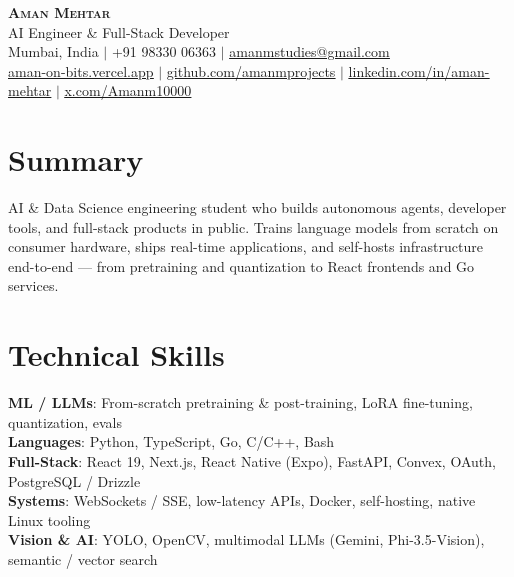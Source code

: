\documentclass[letterpaper,10.5pt]{article}
\begin{document}
\begin{center}
    \textbf{\Huge \scshape Aman Mehtar} \\ \vspace{2pt}
    \small AI Engineer \& Full-Stack Developer \\ \vspace{2pt}
    \small
    Mumbai, India $|$ +91 98330 06363 $|$
    \href{mailto:amanmstudies@gmail.com}{\underline{amanmstudies@gmail.com}} \\ \vspace{2pt}
    \href{https://aman-on-bits.vercel.app}{\underline{aman-on-bits.vercel.app}} $|$
    \href{https://github.com/amanmprojects}{\underline{github.com/amanmprojects}} $|$
    \href{https://www.linkedin.com/in/aman-mehtar}{\underline{linkedin.com/in/aman-mehtar}} $|$
    \href{https://x.com/Amanm10000}{\underline{x.com/Amanm10000}}
\end{center}

\section{Summary}
\small{AI \& Data Science engineering student who builds autonomous agents, developer tools, and full-stack products in public. Trains language models from scratch on consumer hardware, ships real-time applications, and self-hosts infrastructure end-to-end --- from pretraining and quantization to React frontends and Go services.}
\vspace{-2pt}

\section{Technical Skills}
 \begin{itemize}[leftmargin=0.15in, label={}]
    \small{\item{
     \textbf{ML / LLMs}{: From-scratch pretraining \& post-training, LoRA fine-tuning, quantization, evals} \\
     \textbf{Languages}{: Python, TypeScript, Go, C/C++, Bash} \\
     \textbf{Full-Stack}{: React 19, Next.js, React Native (Expo), FastAPI, Convex, OAuth, PostgreSQL / Drizzle} \\
     \textbf{Systems}{: WebSockets / SSE, low-latency APIs, Docker, self-hosting, native Linux tooling} \\
     \textbf{Vision \& AI}{: YOLO, OpenCV, multimodal LLMs (Gemini, Phi-3.5-Vision), semantic / vector search}
    }}
 \end{itemize}
\vspace{-12pt}
\end{document}
